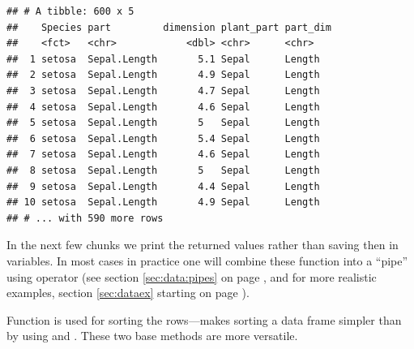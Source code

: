 \documentclass[krantz2]{krantz}\usepackage{knitr}%
\begin{document}
\begin{knitrout}\footnotesize
{}\color{fgcolor}\begin{kframe}
\begin{alltt}
 \hlkwb{<-} 
                     \hlstd{=}  \hlstd{),}
                     \hlstd{=}  \hlstd{))}
\end{alltt}
\begin{verbatim}
## # A tibble: 600 x 5
##    Species part         dimension plant_part part_dim
##    <fct>   <chr>            <dbl> <chr>      <chr>   
##  1 setosa  Sepal.Length       5.1 Sepal      Length  
##  2 setosa  Sepal.Length       4.9 Sepal      Length  
##  3 setosa  Sepal.Length       4.7 Sepal      Length  
##  4 setosa  Sepal.Length       4.6 Sepal      Length  
##  5 setosa  Sepal.Length       5   Sepal      Length  
##  6 setosa  Sepal.Length       5.4 Sepal      Length  
##  7 setosa  Sepal.Length       4.6 Sepal      Length  
##  8 setosa  Sepal.Length       5   Sepal      Length  
##  9 setosa  Sepal.Length       4.4 Sepal      Length  
## 10 setosa  Sepal.Length       4.9 Sepal      Length  
## # ... with 590 more rows
\end{verbatim}
\end{kframe}
\end{knitrout}

In the next few chunks we print the returned values rather than saving then in variables. In most cases in practice one will combine these function into a ``pipe'' using operator \Roperator{\%>\%} (see section \ref{sec:data:pipes} on page \pageref{sec:data:pipes}, and for more realistic examples, section \ref{sec:dataex} starting on page \pageref{sec:dataex}).

Function  is used for sorting the rows---makes sorting a data frame simpler than by using  and . These two base \Rlang methods are more versatile.
\end{document}

